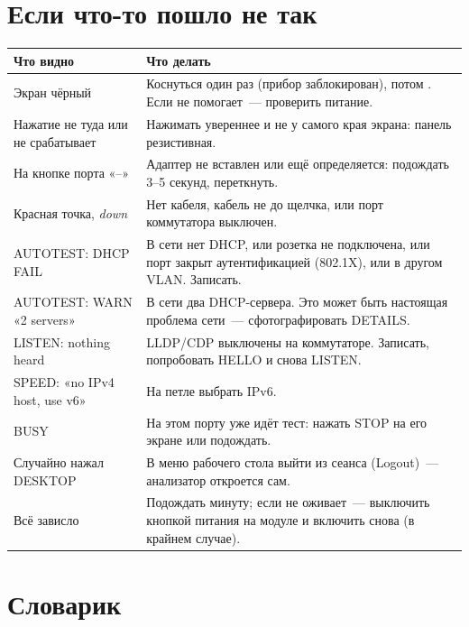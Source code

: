 \documentclass[a4paper,11pt]{article}
\newcommand{\btn}[1]{\mbox{\fcolorbox{gray!55}{gray!12}{\footnotesize\bfseries #1}}}
\begin{document}
\section{Если что-то пошло не так}

\begin{center}
\small
\begin{tabularx}{\textwidth}{>{\raggedright}p{4.6cm}X}
\toprule
Что видно & Что делать \\
\midrule
Экран чёрный & Коснуться один раз (прибор заблокирован), потом \btn{UNLOCK}. Если не помогает~--- проверить питание. \\
Нажатие не туда или не срабатывает & Нажимать увереннее и не у самого края экрана: панель резистивная. \\
На кнопке порта «--» & Адаптер не вставлен или ещё определяется: подождать 3–5 секунд, переткнуть. \\
Красная точка, \emph{down} & Нет кабеля, кабель не до щелчка, или порт коммутатора выключен. \\
AUTOTEST: DHCP FAIL & В сети нет DHCP, или розетка не подключена, или порт закрыт аутентификацией (802.1X), или в другом VLAN. Записать. \\
AUTOTEST: WARN «2 servers» & В сети два DHCP-сервера. Это может быть настоящая проблема сети~--- сфотографировать DETAILS. \\
LISTEN: nothing heard & LLDP/CDP выключены на коммутаторе. Записать, попробовать HELLO и снова LISTEN. \\
SPEED: «no IPv4 host, use v6» & На петле выбрать IPv6. \\
BUSY & На этом порту уже идёт тест: нажать STOP на его экране или подождать. \\
Случайно нажал DESKTOP & В меню рабочего стола выйти из сеанса (Logout)~--- анализатор откроется сам. \\
Всё зависло & Подождать минуту; если не оживает~--- выключить кнопкой питания на модуле и включить снова (в крайнем случае). \\
\bottomrule
\end{tabularx}
\end{center}

\section{Словарик}
\end{document}
